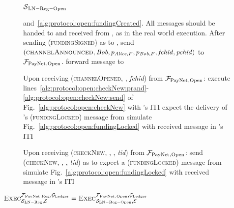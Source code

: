 \begin{figure}[H]
\begin{simulatorbox}{$\mathcal{S}{}_{\mathrm{LN - Reg - Open}}$}
\begin{algorithmic}[1]
            and~\ref{alg:protocol:open:fundingCreated}.
            All messages should be handed to and received from \adversary, as in
            the real world execution.
            \State After sending (\textsc{fundingSigned}) as \bob{} to \alice,
            send $\left(\textsc{channelAnnounced}, \mathit{Bob}, p_{\mathit{Alice}, F}, p_{\mathit{Bob},
            F}, \mathit{fchid}, \mathit{pchid}\right)$ to $\mathcal{F}_{\mathrm{PayNet}}{}_{\mathrm{,
            Open}}$.
            \label{alg:sim:open:announced:bob:bobhonest}
            \State forward message to \adversary{} 
          \EndIf
        \EndIndent
        \Statex

        \State Upon receiving (\textsc{channelOpened}, \alice, \textit{fchid})
        from $\mathcal{F}_{\mathrm{PayNet}}{}_{\mathrm{, Open}}$:
        \Indent
          \State execute
          lines~\ref{alg:protocol:open:checkNew:prand}-\ref{alg:protocol:open:checkNew:send}
          of Fig.~\ref{alg:protocol:open:checkNew} with \alice's ITI
            \State expect the delivery of \alice's (\textsc{fundingLocked})
            message from \adversary
            \State simulate Fig.~\ref{alg:protocol:open:fundingLocked} with
            received message in \bob's ITI
          \EndIf
        \EndIndent
        \Statex

        \State Upon receiving (\textsc{checkNew}, \alice, \bob, \textit{tid})
        from $\mathcal{F}_{\mathrm{PayNet}}{}_{\mathrm{, Open}}$: 
        \Indent
          \State send (\textsc{checkNew}, \alice, \bob, \textit{tid}) as
          \environment{} to \adversary
            \State expect a (\textsc{fundingLocked}) message from \adversary
            \State simulate Fig.~\ref{alg:protocol:open:fundingLocked} with
            received message in \bob's ITI
          \EndIf
        \EndIndent
      \end{algorithmic}
    \end{simulatorbox}
    \caption{}
    \label{alg:sim:open}
  \end{figure}

  \begin{lemma}
    \label{lemma:open}
    $\textsc{Exec}^{\mathcal{F}_{\mathrm{PayNet}}{}_{\mathrm{, Reg}},
    \mathcal{G}_{\mathrm{Ledger}}}_{\mathcal{S}_{\mathrm{LN - Reg}}, \mathcal{E}} =
    \textsc{Exec}^{\mathcal{F}_{\mathrm{PayNet}}{}_{\mathrm{, Open}},
    \mathcal{G}_{\mathrm{Ledger}}}_{\mathcal{S}_{\mathrm{LN - Reg - Open}}, \mathcal{E}}$
  \end{lemma}


